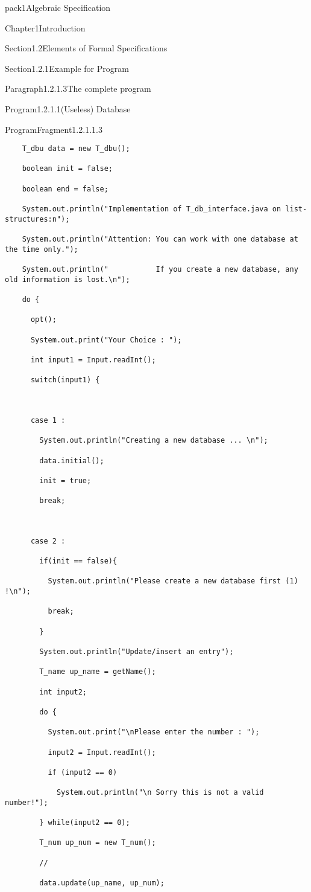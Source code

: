 \documentclass[landscape, slides, light]{mmiss2}
\begin{document}
\begin{Package}{pack1}{Algebraic
Specification}
\begin{Section}{Chapter1}{Introduction}
\begin{Section}{Section1.2}{Elements of Formal Specifications}{}
\begin{Section}{Section1.2.1}{Example for Program}{}
\begin{Paragraph}{Paragraph1.2.1.3}{The complete program}{}
\begin{Program}{Program1.2.1.1}{(Useless) Database}{}
\begin{ProgramFragment}{ProgramFragment1.2.1.1.3}{}{}
\begin{verbatim}
    T_dbu data = new T_dbu();

    boolean init = false;

    boolean end = false;

    System.out.println("Implementation of T_db_interface.java on list-structures:n");

    System.out.println("Attention: You can work with one database at the time only.");

    System.out.println("           If you create a new database, any old information is lost.\n");

    do {

      opt();

      System.out.print("Your Choice : ");  

      int input1 = Input.readInt();

      switch(input1) {



      case 1 :

        System.out.println("Creating a new database ... \n");

        data.initial();

        init = true;

        break;



      case 2 :

        if(init == false){

          System.out.println("Please create a new database first (1) !\n");

          break;

        }

        System.out.println("Update/insert an entry");

        T_name up_name = getName();

        int input2;

        do {

          System.out.print("\nPlease enter the number : ");

          input2 = Input.readInt();

          if (input2 == 0)

            System.out.println("\n Sorry this is not a valid number!");

        } while(input2 == 0);   

        T_num up_num = new T_num();

        //

        data.update(up_name, up_num);


\end{verbatim}
\end{ProgramFragment}
\end{Program}
\end{Paragraph}
\end{Section}
\end{Section}
\end{Section}
\end{Package}
\end{document}
